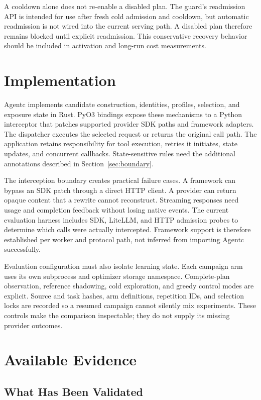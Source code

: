 A cooldown alone does not re-enable a disabled plan. The guard's readmission API
is intended for use after fresh cold admission and cooldown, but automatic
readmission is not wired into the
current serving path. A disabled plan therefore remains blocked until explicit
readmission. This conservative recovery behavior should be included in activation
and long-run cost measurements.

\section{Implementation}
\label{sec:implementation}

Agentc implements candidate construction, identities, profiles, selection, and
exposure state in Rust. PyO3 bindings expose these mechanisms to a Python interceptor
that patches supported provider SDK paths and framework adapters. The dispatcher
executes the selected request or returns the original call path. The application
retains responsibility for tool execution, retries it initiates, state updates,
and concurrent callbacks. State-sensitive rules need the additional annotations
described in Section~\ref{sec:boundary}.

The interception boundary creates practical failure cases. A framework can bypass
an SDK patch through a direct HTTP client. A provider can return opaque content that
a rewrite cannot reconstruct. Streaming responses need usage and completion feedback
without losing native events. The current evaluation harness includes SDK, LiteLLM,
and HTTP admission probes to determine which calls were actually intercepted.
Framework support is therefore established per worker and protocol path, not inferred
from importing Agentc successfully.

Evaluation configuration must also isolate learning state. Each campaign arm uses
its own subprocess and optimizer storage namespace. Complete-plan observation,
reference shadowing, cold exploration, and greedy control modes are explicit.
Source and task hashes, arm definitions, repetition IDs, and selection locks are
recorded so a resumed campaign cannot silently mix experiments. These controls
make the comparison inspectable; they do not supply its missing provider outcomes.

\section{Available Evidence}
\label{sec:eval}

\subsection{What Has Been Validated}

